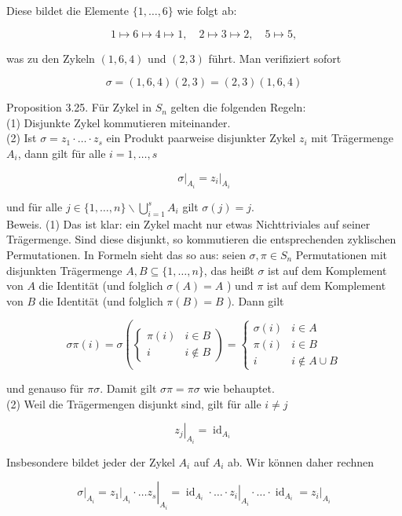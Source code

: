 \documentclass[10pt, letterpaper]{article}
\begin{document}
Diese bildet die Elemente $\{1, \ldots, 6\}$ wie folgt ab:

$$
1 \mapsto 6 \mapsto 4 \mapsto 1, \quad 2 \mapsto 3 \mapsto 2, \quad 5 \mapsto 5,
$$

was zu den Zykeln $(1,6,4)$ und $(2,3)$ führt. Man verifiziert sofort

$$
\sigma=(1,6,4)(2,3)=(2,3)(1,6,4)
$$

Proposition 3.25. Für Zykel in $S_{n}$ gelten die folgenden Regeln:\\
(1) Disjunkte Zykel kommutieren miteinander.\\
(2) Ist $\sigma=z_{1} \cdot \ldots \cdot z_{s}$ ein Produkt paarweise disjunkter Zykel $z_{i}$ mit Trägermenge $A_{i}$, dann gilt für alle $i=1, \ldots, s$

$$
\left.\sigma\right|_{A_{i}}=\left.z_{i}\right|_{A_{i}}
$$

und für alle $j \in\{1, \ldots, n\} \backslash \bigcup_{i=1}^{s} A_{i}$ gilt $\sigma(j)=j$.\\
Beweis. (1) Das ist klar: ein Zykel macht nur etwas Nichttriviales auf seiner Trägermenge. Sind diese disjunkt, so kommutieren die entsprechenden zyklischen Permutationen. In Formeln sieht das so aus: seien $\sigma, \pi \in S_{n}$ Permutationen mit disjunkten Trägermenge $A, B \subseteq\{1, \ldots, n\}$, das heißt $\sigma$ ist auf dem Komplement von $A$ die Identität (und folglich $\sigma(A)=A$ ) und $\pi$ ist auf dem Komplement von $B$ die Identität (und folglich $\pi(B)=B$ ). Dann gilt

$$
\sigma \pi(i)=\sigma\left(\left\{\begin{array}{ll}
\pi(i) & i \in B \\
i & i \notin B
\end{array}\right)= \begin{cases}\sigma(i) & i \in A \\
\pi(i) & i \in B \\
i & i \notin A \cup B\end{cases}\right.
$$

und genauso für $\pi \sigma$. Damit gilt $\sigma \pi=\pi \sigma$ wie behauptet.\\
(2) Weil die Trägermengen disjunkt sind, gilt für alle $i \neq j$

$$
\left.z_{j}\right|_{A_{i}}=\operatorname{id}_{A_{i}}
$$

Insbesondere bildet jeder der Zykel $A_{i}$ auf $A_{i}$ ab. Wir können daher rechnen

$$
\left.\sigma\right|_{A_{i}}=\left.\left.z_{1}\right|_{A_{i}} \cdot \ldots z_{s}\right|_{A_{i}}=\left.\operatorname{id}_{A_{i}} \cdot \ldots \cdot z_{i}\right|_{A_{i}} \cdot \ldots \cdot \operatorname{id}_{A_{i}}=\left.z_{i}\right|_{A_{i}}
$$
\end{document}

